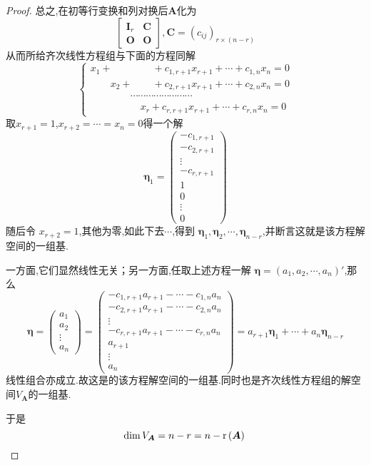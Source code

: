 {\begin{proof}
    总之,在初等行变换和列对换后$\bm{A}$化为
    \[
        \begin{bmatrix}
            \bm{I}_r & \bm{C} \\\bm{O} & \bm{O}
        \end{bmatrix}
        ,\bm{C}=\left(c_{ij}\right)_{r\times \left(n-r\right)}
    \]
    从而所给齐次线性方程组与下面的方程同解
    \[
        \begin{cases*}
            x_1+\qquad \qquad +c_{1,r+1}x_{r+1}+\cdots+c_{1,n}x_n=0      \\
            \qquad x_2+\qquad +c_{2,r+1}x_{r+1}+\cdots+c_{2,n}x_n=0      \\
            \qquad\qquad\cdots\cdots\cdots\cdots\cdots\cdots\cdots\cdots \\
            \qquad\qquad \quad x_r+c_{r,r+1}x_{r+1}+\cdots+c_{r,n}x_n=0
        \end{cases*}
    \]
    取$x_{r+1}=1$,$x_{r+2}=\cdots=x_n=0$得一个解
    \[
        \bm{\eta}_1=\begin{pmatrix}
            -c_{1,r+1} \\
            -c_{2,r+1} \\
            \vdots     \\
            -c_{r,r+1} \\
            1          \\
            0          \\
            \vdots     \\
            0
        \end{pmatrix}
    \]
    随后令
    $x_{r+2}=1$,其他为零,如此下去$\cdots$,得到
    $\bm{\eta}_1,\bm{\eta}_2,\cdots,\bm{\eta}_{n-r}
    $,并断言这就是该方程解空间的一组基.

    一方面,它们显然线性无关；另一方面,任取上述方程一解
    $\bm{\eta}=\left(a_1,a_2,\cdots,a_n\right)
        '$,那么
    \[
        \bm{\eta}=\begin{pmatrix}
            a_1 \\a_2\\\vdots\\a_n
        \end{pmatrix}
        =\begin{pmatrix}
            -c_{1,r+1}a_{r+1}-\cdots-c_{1,n}a_n \\
            -c_{2,r+1}a_{r+1}-\cdots-c_{2,n}a_n \\
            \vdots                              \\
            -c_{r,r+1}a_{r+1}-\cdots-c_{r,n}a_n \\
            a_{r+1}                             \\
            \vdots                              \\
            a_n
        \end{pmatrix}=a_{r+1}\bm{\eta}_1+\cdots+a_n\bm{\eta}
        _{n-r}
    \]
    线性组合亦成立.故这是的该方程解空间的一组基.同时也是齐次线性方程组的解空间$V_{\bm{A}}$的一组基.

    于是
    \[
        \dim V_{\bm{A}}=n-r=n-\mathrm{r} \left(\bm{A}
        \right)
        \qedhere
    \]
\end{proof}
}
